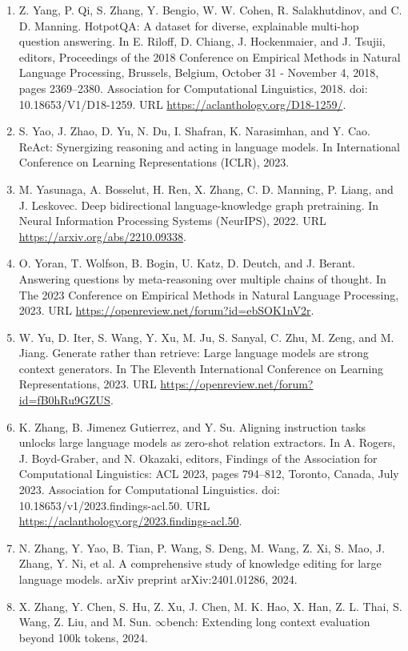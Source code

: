 \documentclass[11pt,UTF8,fontset=fandol]{ctexart}
\begin{document}
\begin{enumerate}[leftmargin=2em]
\item Z. Yang, P. Qi, S. Zhang, Y. Bengio, W. W. Cohen, R. Salakhutdinov, and C. D. Manning. HotpotQA: A dataset for diverse, explainable multi-hop question answering. In E. Riloff, D. Chiang, J. Hockenmaier, and J. Tsujii, editors, Proceedings of the 2018 Conference on Empirical Methods in Natural Language Processing, Brussels, Belgium, October 31 - November 4, 2018, pages 2369--2380. Association for Computational Linguistics, 2018. doi: 10.18653/V1/D18-1259. URL \url{https://aclanthology.org/D18-1259/}.
\item S. Yao, J. Zhao, D. Yu, N. Du, I. Shafran, K. Narasimhan, and Y. Cao. ReAct: Synergizing reasoning and acting in language models. In International Conference on Learning Representations (ICLR), 2023.
\item M. Yasunaga, A. Bosselut, H. Ren, X. Zhang, C. D. Manning, P. Liang, and J. Leskovec. Deep bidirectional language-knowledge graph pretraining. In Neural Information Processing Systems (NeurIPS), 2022. URL \url{https://arxiv.org/abs/2210.09338}.
\item O. Yoran, T. Wolfson, B. Bogin, U. Katz, D. Deutch, and J. Berant. Answering questions by meta-reasoning over multiple chains of thought. In The 2023 Conference on Empirical Methods in Natural Language Processing, 2023. URL \url{https://openreview.net/forum?id=ebSOK1nV2r}.
\item W. Yu, D. Iter, S. Wang, Y. Xu, M. Ju, S. Sanyal, C. Zhu, M. Zeng, and M. Jiang. Generate rather than retrieve: Large language models are strong context generators. In The Eleventh International Conference on Learning Representations, 2023. URL \url{https://openreview.net/forum?id=fB0hRu9GZUS}.
\item K. Zhang, B. Jimenez Gutierrez, and Y. Su. Aligning instruction tasks unlocks large language models as zero-shot relation extractors. In A. Rogers, J. Boyd-Graber, and N. Okazaki, editors, Findings of the Association for Computational Linguistics: ACL 2023, pages 794--812, Toronto, Canada, July 2023. Association for Computational Linguistics. doi: 10.18653/v1/2023.findings-acl.50. URL \url{https://aclanthology.org/2023.findings-acl.50}.
\item N. Zhang, Y. Yao, B. Tian, P. Wang, S. Deng, M. Wang, Z. Xi, S. Mao, J. Zhang, Y. Ni, et al. A comprehensive study of knowledge editing for large language models. arXiv preprint arXiv:2401.01286, 2024.
\item X. Zhang, Y. Chen, S. Hu, Z. Xu, J. Chen, M. K. Hao, X. Han, Z. L. Thai, S. Wang, Z. Liu, and M. Sun. $\infty$bench: Extending long context evaluation beyond 100k tokens, 2024.

\end{enumerate}
\end{document}
